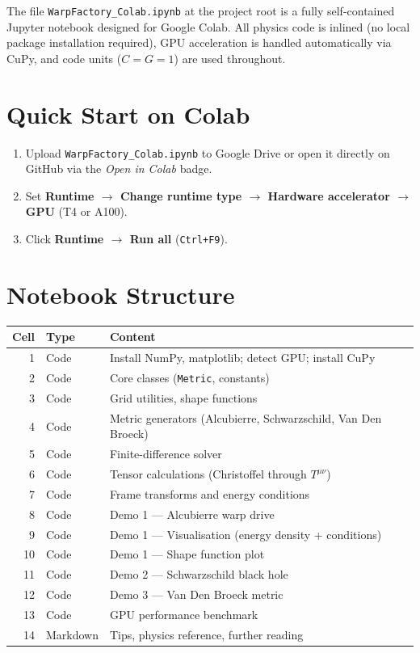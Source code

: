 \documentclass[11pt, a4paper, twoside]{report}
\begin{document}
The file \texttt{WarpFactory\_Colab.ipynb} at the project root is a
fully self-contained Jupyter notebook designed for Google Colab.  All
physics code is inlined (no local package installation required), GPU
acceleration is handled automatically via CuPy, and code units
($C=G=1$) are used throughout.

\section{Quick Start on Colab}

\begin{enumerate}
  \item Upload \texttt{WarpFactory\_Colab.ipynb} to Google Drive or
        open it directly on GitHub via the \emph{Open in Colab} badge.
  \item Set \textbf{Runtime $\to$ Change runtime type $\to$ Hardware
        accelerator $\to$ GPU} (T4 or A100).
  \item Click \textbf{Runtime $\to$ Run all} (\texttt{Ctrl+F9}).
\end{enumerate}

\section{Notebook Structure}

\begin{center}
\begin{tabularx}{\linewidth}{rlX}
  \toprule
  Cell & Type & Content \\
  \midrule
  1 & Code & Install NumPy, matplotlib; detect GPU; install CuPy \\
  2 & Code & Core classes (\texttt{Metric}, constants) \\
  3 & Code & Grid utilities, shape functions \\
  4 & Code & Metric generators (Alcubierre, Schwarzschild,
             Van Den Broeck) \\
  5 & Code & Finite-difference solver \\
  6 & Code & Tensor calculations (Christoffel through $T^{\mu\nu}$) \\
  7 & Code & Frame transforms and energy conditions \\
  8 & Code & Demo 1 — Alcubierre warp drive \\
  9 & Code & Demo 1 — Visualisation (energy density + conditions) \\
  10 & Code & Demo 1 — Shape function plot \\
  11 & Code & Demo 2 — Schwarzschild black hole \\
  12 & Code & Demo 3 — Van Den Broeck metric \\
  13 & Code & GPU performance benchmark \\
  14 & Markdown & Tips, physics reference, further reading \\
  \bottomrule
\end{tabularx}
\end{center}
\end{document}
